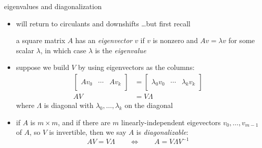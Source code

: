 \documentclass[10pt,
               svgnames,
               hyperref={colorlinks,citecolor=DeepPink4,linkcolor=FireBrick,urlcolor=Maroon},
               usepdftitle=false]{beamer}
\begin{document}
\begin{frame}{eigenvalues and diagonalization}

\begin{itemize}
\item will return to circulants and downshifts \dots but first recall

\begin{definition}
a square matrix $A$ has an \emph{eigenvector} $v$ if $v$ is nonzero and $Av=\lambda v$ for some scalar $\lambda$, in which case $\lambda$ is the \emph{eigenvalue}
\end{definition}

\item suppose we build $V$ by using eigenvectors as the columns:
\begin{align*}
\left[\begin{array}{c|c|c} && \\ A v_0 & \cdots & A v_k \\ && \end{array} \right] &= \left[\begin{array}{c|c|c} && \\ \lambda_0 v_0 & \cdots & \lambda_k v_k \\ && \end{array} \right] \\
A V &= V \Lambda
\end{align*}
where $\Lambda$ is diagonal with $\lambda_0,\dots,\lambda_k$ on the diagonal
\item if $A$ is $m\times m$, and \alert{if} there are $m$ linearly-independent eigevectors $v_0,\dots,v_{m-1}$ of $A$, so $V$ is invertible, then we say $A$ is \emph{diagonalizable}:
	$$AV = V \Lambda \qquad \iff \qquad A = V \Lambda V^{-1}$$
\end{itemize}
\end{frame}
\end{document}
